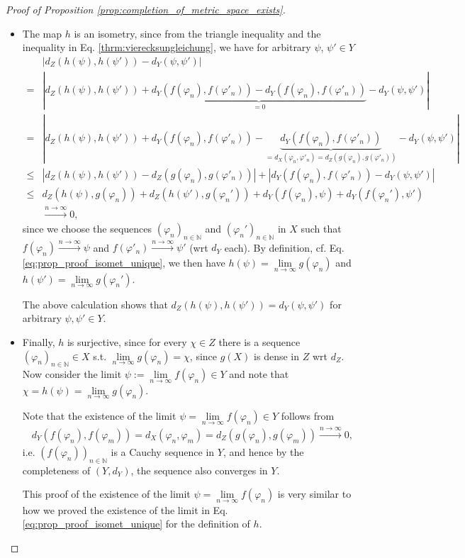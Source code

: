 \documentclass[12pt, a4paper]{article}
\numberwithin{equation}{section}
\theoremstyle{definition}
\theoremstyle{definition}
\newcommand{\abs}[1]{\left\vert #1 \right\vert}
\newcommand{\seq}[1][\varphi]{\left( #1 \right)_{n \in \mathbb{N}}}
\begin{document}
\begin{proof}[Proof of Proposition \ref{prop:completion_of_metric_space_exists}]
\begin{itemize}
			\item The map $h$ is an isometry, since from the triangle inequality and the inequality in Eq. \eqref{thrm:vierecksungleichung}, we have for arbitrary $\psi$, $\psi'\in Y$
			\begin{align*}
				&\abs{d_Z(h(\psi), h(\psi')) - d_Y(\psi, \psi')} 
				\\ = &\abs{d_Z(h(\psi), h(\psi')) + \underbrace{d_Y(f(\varphi_n), f(\varphi'_n)) - d_Y(f(\varphi_n), f(\varphi'_n))}_{=0} - d_Y(\psi, \psi')}
				\\ = &\abs{d_Z(h(\psi), h(\psi')) + d_Y(f(\varphi_n), f(\varphi'_n)) - \underbrace{d_Y(f(\varphi_n), f(\varphi'_n))}_{=d_X(\varphi_n, \varphi'_n) = d_Z(g(\varphi_n), g(\varphi'_n))} - d_Y(\psi, \psi')}
				\\ \leq &\abs{d_Z(h(\psi), h(\psi')) - d_Z(g(\varphi_n), g(\varphi'_n))} + \abs{d_Y(f(\varphi_n), f(\varphi'_n)) - d_Y(\psi, \psi')}
				\\ \leq &d_Z(h(\psi), g(\varphi_n)) + d_Z(h(\psi'), g(\varphi_n')) + d_Y(f(\varphi_n), \psi) + d_Y(f(\varphi_n'), \psi')
				\\ &\overset{n\to\infty}{\longrightarrow} 0, 
			\end{align*}
			since we choose the sequences $\seq[\varphi_n]$ and $\seq[\varphi_n']$ in $X$ such that $f(\varphi_n) \overset{n\to\infty}{\longrightarrow}\psi$ and $f(\varphi'_n) \overset{n\to\infty}{\longrightarrow}\psi'$ (wrt $d_Y$ each). By definition, cf. Eq. \eqref{eq:prop_proof_isomet_unique}, we then have $h(\psi) = \lim\limits_{n\to\infty}g(\varphi_n)$ and $h(\psi') = \lim\limits_{n\to\infty}g(\varphi_n')$.
			
			The above calculation shows that $d_Z(h(\psi), h(\psi')) = d_Y(\psi, \psi')$ for arbitrary $\psi, \psi'\in Y$.

			\item Finally, $h$ is surjective, since for every $\chi\in Z$ there is a sequence $\seq[\varphi_n]\in X$ s.t. $\lim\limits_{n\to\infty}g(\varphi_n) = \chi$, since $g(X)$ is dense in $Z$ wrt $d_Z$. Now consider the limit $\psi := \lim\limits_{n\to\infty} f(\varphi_n)\in Y$ and note that $\chi = h(\psi) = \lim\limits_{n\to\infty}g(\varphi_n)$.
			
			Note that the existence of the limit $\psi = \lim\limits_{n\to\infty} f(\varphi_n)\in Y$ follows from
			\begin{align}
				d_Y(f(\varphi_n), f(\varphi_m)) = d_X(\varphi_n, \varphi_m) = d_Z(g(\varphi_n), g(\varphi_m)) \overset{n\to\infty}{\longrightarrow} 0, 
			\end{align}
			i.e. $\seq[f(\varphi_n)]$ is a Cauchy sequence in $Y$, and hence by the completeness of $(Y, d_Y)$, the sequence also converges in $Y$.
			
			This proof of the existence of the limit $\psi = \lim\limits_{n\to\infty} f(\varphi_n)$ is very similar to how we proved the existence of the limit in Eq. \eqref{eq:prop_proof_isomet_unique} for the definition of $h$.
		\end{itemize}
	\end{proof}
	
\end{document}
